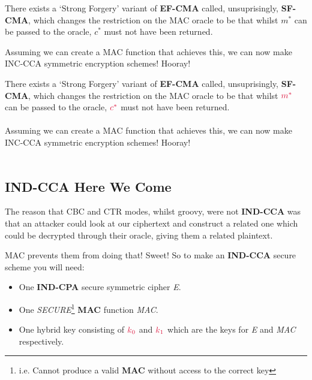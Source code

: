     There exists a `Strong Forgery' variant of \textbf{EF-CMA} called, unsuprisingly, \textbf{SF-CMA}, which changes the restriction on the MAC oracle to be that whilst $m^{*}$ can be passed to the oracle, $c^{*}$ must not have been returned.

    Assuming we can create a MAC function that achieves this, we can now make INC-CCA symmetric encryption schemes! Hooray!

    There exists a `Strong Forgery' variant of \textbf{EF-CMA} called, unsuprisingly, \textbf{SF-CMA}, which changes the restriction on the MAC oracle to be that whilst $\cmast$ can be passed to the oracle, $\ccast$ must not have been returned.\\
    \\
    Assuming we can create a MAC function that achieves this, we can now make INC-CCA symmetric encryption schemes! Hooray!\\
    \\
    \subsection{IND-CCA Here We Come}
    The reason that CBC and CTR modes, whilst groovy, were not \textbf{IND-CCA} was that an attacker could look at our ciphertext and construct a related one which could be decrypted through their oracle, giving them a related plaintext.

    MAC prevents them from doing that! Sweet! So to make an \textbf{IND-CCA} secure scheme you will need:
    \begin{itemize}
        \item One \textbf{IND-CPA} secure symmetric cipher \emph{E}.
        \item One \emph{SECURE}\footnote{i.e. Cannot produce a valid \textbf{MAC} without access to the correct key} \textbf{MAC} function \emph{MAC}.
        \item One hybrid key consisting of $\csubk{0}$ and $\csubk{1}$ which are the keys for \emph{E} and \emph{MAC} respectively.
    \end{itemize}

